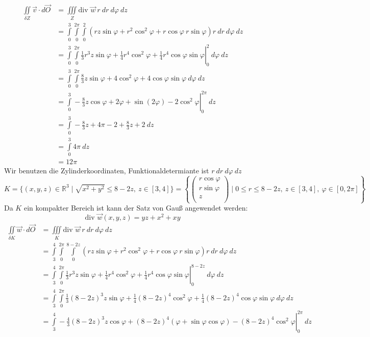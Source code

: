 \documentclass[10pt,a4paper,parskip=half]{scrartcl}
\newcommand{\R}{\mathbb{R}}
\newcommand{\vecthree}[3]{\begin{pmatrix}#1\\#2\\#3\\\end {pmatrix}}
\begin{document}
\begin{enumerate}[(a)]
      \begin{align*}
            \iint\limits_{\delta Z} \vec v \cdot d \vec O &= \iiint\limits_{Z} \text{div } \vec w~ r~dr ~d\varphi~ dz \\
            &= \int\limits_{0}^3\int\limits_0^{2\pi}\int\limits_0^2  (rz\sin\varphi + r^2\cos^2\varphi + r\cos\varphi ~r\sin\varphi )r~dr ~d\varphi~ dz \\
            &= \left.\int\limits_{0}^3\int\limits_0^{2\pi}  \frac 13 r^3z \sin \varphi + \frac 14 r^4 \cos^2 \varphi + \frac 14 r^4 \cos \varphi \sin \varphi \right|^2_0  ~d\varphi ~ dz  \\
            &= \int\limits_{0}^3\int\limits_0^{2\pi} \frac 83 z \sin \varphi + 4\cos^2 \varphi + 4\cos \varphi \sin \varphi ~d\varphi ~dz \\
            &= \left.\int\limits_0^3 -\frac 83  z \cos \varphi + 2\varphi + \sin (2\varphi ) - 2\cos^2\varphi \right|^{2\pi}_0 ~dz\\
            &= \int\limits_0^3 - \frac 83 z + 4\pi - 2 + \frac 83z + 2 ~dz \\
            &= \int\limits_0^3  4\pi ~dz \\
            &= 12\pi
      \end{align*}
Wir benutzen die Zylinderkoordinaten, Funktionaldetermiante ist $r~dr ~ d\varphi ~dz$
   \[ K = \{ (x,y,z) \in \R^3  \mid \sqrt{x^2 + y^2} \le 8 - 2z ,~z \in [3,4]\} = \left\{ \vecthree{r \cos \varphi}{r\sin \varphi}{z} \mid 0 \le r \le 8-2z, ~z \in [3,4] ,~ \varphi \in [0,2\pi] \right\} \] 
   Da $K$ ein kompakter Bereich ist kann der Satz von Gauß angewendet werden:
   \[ \text{div } \vec w(x,y,z) =  yz + x^2 + xy\]
      \begin{align*}
            \iint\limits_{\delta K} \vec w \cdot d \vec O &= \iiint\limits_{K} \text{div } \vec w~ r~dr ~d\varphi~ dz \\
            &= \int\limits_{3}^4\int\limits_0^{2\pi}\int\limits_0^{8-2z}  (rz\sin\varphi + r^2\cos^2\varphi + r\cos\varphi ~r\sin\varphi )r~dr ~d\varphi~ dz \\
             &= \left.\int\limits_{3}^4\int\limits_0^{2\pi}  \frac 13 r^3z \sin \varphi + \frac 14 r^4 \cos^2 \varphi + \frac 14 r^4 \cos \varphi \sin \varphi \right|^{8-2z}_0 ~d\varphi~ dz \\
              &= \int\limits_{3}^4\int\limits_0^{2\pi}  \frac 13 (8-2z)^3z\sin \varphi + \frac 14 (8-2z)^4\cos^2\varphi + \frac 14 (8-2z)^4\cos \varphi \sin \varphi  ~d\varphi~ dz \\
               &= \left.\int\limits_{3}^4  - \frac 43 (8-2z)^3z\cos \varphi + (8-2z)^4(\varphi + \sin \varphi \cos \varphi) -(8-2z)^4\cos^2 \varphi  \right|^{2\pi}_{0}~ dz \\

\end{align*}
\end{enumerate}
\end{document}

